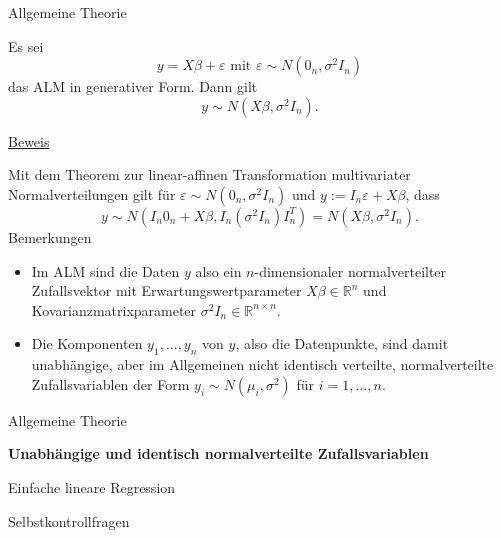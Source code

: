 \documentclass[
  8pt,
  ignorenonframetext,
]{beamer}
\providecommand{\tightlist}{%
  \setlength{\itemsep}{0pt}\setlength{\parskip}{0pt}}
\begin{document}
\begin{frame}{Allgemeine Theorie}
\protect\hypertarget{allgemeine-theorie-2}{}
\footnotesize
\begin{theorem}
\justifying
\normalfont
Es sei
\begin{equation}
y = X\beta + \varepsilon \mbox{ mit } \varepsilon \sim N(0_n,\sigma^2I_n)
\end{equation}
das ALM in generativer Form. Dann gilt
\begin{equation}
y \sim N(X\beta,\sigma^2I_n).
\end{equation}
\end{theorem}

\underline{Beweis}

Mit dem Theorem zur linear-affinen Transformation multivariater
Normalverteilungen gilt für \(\varepsilon \sim N(0_n,\sigma^2I_n)\) und
\(y := I_n\varepsilon + X\beta\), dass \begin{equation}
y \sim N\left(I_n0_n + X\beta, I_n (\sigma^2 I_n) I_n^T\right) = N(X\beta, \sigma^2 I_n).
\end{equation} Bemerkungen

\begin{itemize}
\tightlist
\item
  Im ALM sind die Daten \(y\) also ein \(n\)-dimensionaler
  normalverteilter Zufallsvektor mit Erwartungswertparameter
  \(X\beta \in \mathbb{R}^n\) und Kovarianzmatrixparameter
  \(\sigma^2I_n \in \mathbb{R}^{n \times n}\).
\item
  Die Komponenten \(y_1,...,y_n\) von \(y\), also die Datenpunkte, sind
  damit unabhängige, aber im Allgemeinen nicht identisch verteilte,
  normalverteilte Zufallsvariablen der Form
  \(y_i \sim N(\mu_i,\sigma^2)\) für \(i = 1,...,n\).
\end{itemize}
\end{frame}

\begin{frame}{}
\protect\hypertarget{section-4}{}
\large
{}
\vfill

Allgemeine Theorie

\textbf{Unabhängige und identisch normalverteilte Zufallsvariablen}

Einfache lineare Regression

Selbstkontrollfragen \vfill
\end{frame}
\end{document}
